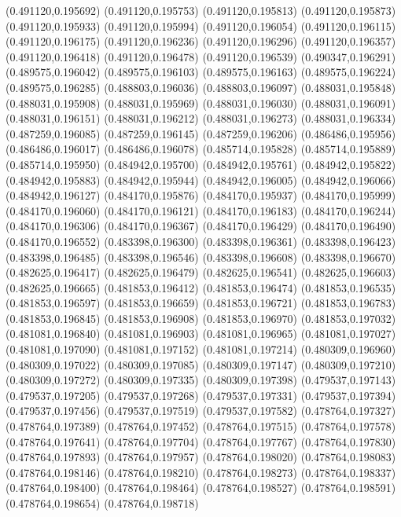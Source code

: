 (0.491120,0.195692)
(0.491120,0.195753)
(0.491120,0.195813)
(0.491120,0.195873)
(0.491120,0.195933)
(0.491120,0.195994)
(0.491120,0.196054)
(0.491120,0.196115)
(0.491120,0.196175)
(0.491120,0.196236)
(0.491120,0.196296)
(0.491120,0.196357)
(0.491120,0.196418)
(0.491120,0.196478)
(0.491120,0.196539)
(0.490347,0.196291)
(0.489575,0.196042)
(0.489575,0.196103)
(0.489575,0.196163)
(0.489575,0.196224)
(0.489575,0.196285)
(0.488803,0.196036)
(0.488803,0.196097)
(0.488031,0.195848)
(0.488031,0.195908)
(0.488031,0.195969)
(0.488031,0.196030)
(0.488031,0.196091)
(0.488031,0.196151)
(0.488031,0.196212)
(0.488031,0.196273)
(0.488031,0.196334)
(0.487259,0.196085)
(0.487259,0.196145)
(0.487259,0.196206)
(0.486486,0.195956)
(0.486486,0.196017)
(0.486486,0.196078)
(0.485714,0.195828)
(0.485714,0.195889)
(0.485714,0.195950)
(0.484942,0.195700)
(0.484942,0.195761)
(0.484942,0.195822)
(0.484942,0.195883)
(0.484942,0.195944)
(0.484942,0.196005)
(0.484942,0.196066)
(0.484942,0.196127)
(0.484170,0.195876)
(0.484170,0.195937)
(0.484170,0.195999)
(0.484170,0.196060)
(0.484170,0.196121)
(0.484170,0.196183)
(0.484170,0.196244)
(0.484170,0.196306)
(0.484170,0.196367)
(0.484170,0.196429)
(0.484170,0.196490)
(0.484170,0.196552)
(0.483398,0.196300)
(0.483398,0.196361)
(0.483398,0.196423)
(0.483398,0.196485)
(0.483398,0.196546)
(0.483398,0.196608)
(0.483398,0.196670)
(0.482625,0.196417)
(0.482625,0.196479)
(0.482625,0.196541)
(0.482625,0.196603)
(0.482625,0.196665)
(0.481853,0.196412)
(0.481853,0.196474)
(0.481853,0.196535)
(0.481853,0.196597)
(0.481853,0.196659)
(0.481853,0.196721)
(0.481853,0.196783)
(0.481853,0.196845)
(0.481853,0.196908)
(0.481853,0.196970)
(0.481853,0.197032)
(0.481081,0.196840)
(0.481081,0.196903)
(0.481081,0.196965)
(0.481081,0.197027)
(0.481081,0.197090)
(0.481081,0.197152)
(0.481081,0.197214)
(0.480309,0.196960)
(0.480309,0.197022)
(0.480309,0.197085)
(0.480309,0.197147)
(0.480309,0.197210)
(0.480309,0.197272)
(0.480309,0.197335)
(0.480309,0.197398)
(0.479537,0.197143)
(0.479537,0.197205)
(0.479537,0.197268)
(0.479537,0.197331)
(0.479537,0.197394)
(0.479537,0.197456)
(0.479537,0.197519)
(0.479537,0.197582)
(0.478764,0.197327)
(0.478764,0.197389)
(0.478764,0.197452)
(0.478764,0.197515)
(0.478764,0.197578)
(0.478764,0.197641)
(0.478764,0.197704)
(0.478764,0.197767)
(0.478764,0.197830)
(0.478764,0.197893)
(0.478764,0.197957)
(0.478764,0.198020)
(0.478764,0.198083)
(0.478764,0.198146)
(0.478764,0.198210)
(0.478764,0.198273)
(0.478764,0.198337)
(0.478764,0.198400)
(0.478764,0.198464)
(0.478764,0.198527)
(0.478764,0.198591)
(0.478764,0.198654)
(0.478764,0.198718)
